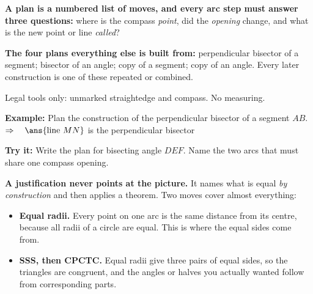 \documentclass[12pt]{article}
\begin{document}


\begin{formulabox}
\textbf{A plan is a numbered list of moves, and every arc step must answer three
questions:} where is the compass \emph{point}, did the \emph{opening} change, and what is
the new point or line \emph{called}?\par
\smallskip
\textbf{The four plans everything else is built from:} perpendicular bisector of a
segment; bisector of an angle; copy of a segment; copy of an angle. Every later
construction is one of these repeated or combined.\par
\smallskip
Legal tools only: unmarked straightedge and compass. No measuring.
\end{formulabox}

\begin{examplebox}
\textbf{Example:} \quad Plan the construction of the perpendicular bisector of a segment
$AB$.
$\Rightarrow\quad \ans{\text{line } MN}$ is the perpendicular bisector
\end{examplebox}

\begin{tryitbox}
\textbf{Try it:} \quad Write the plan for bisecting angle $DEF$. Name the two arcs that
must share one compass opening.\\[2pt]
\end{tryitbox}


\begin{formulabox}
\textbf{A justification never points at the picture.} It names what is equal
\emph{by construction} and then applies a theorem. Two moves cover almost everything:
\begin{itemize}[label={$\bullet$}, leftmargin=1.1cm, itemsep=1pt, topsep=2pt]
  \item \textbf{Equal radii.} Every point on one arc is the same distance from its centre,
        because all radii of a circle are equal. This is where the equal sides come from.
  \item \textbf{SSS, then CPCTC.} Equal radii give three pairs of equal sides, so the
        triangles are congruent, and the angles or halves you actually wanted follow from
        corresponding parts.
\end{itemize}
\end{formulabox}
\end{document}

